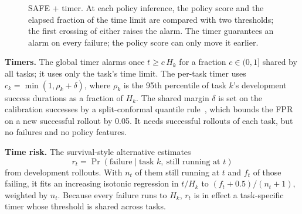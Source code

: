 \documentclass[10pt,a4paper,twocolumn]{article}
\begin{document}
\begin{figure}[t]
\centering
{}
\caption{SAFE + timer. At each policy inference, the policy score and the elapsed fraction
of the time limit are compared with two thresholds; the first crossing of either raises the
alarm. The timer guarantees an alarm on every failure; the policy score can only move it
earlier.}
\label{fig:method}
\end{figure}

\textbf{Timers.} The global timer alarms once $t \ge c\,H_k$ for a fraction $c \in (0, 1]$
shared by all tasks; it uses only the task's time limit. The per-task timer uses
$c_k = \min(1, \rho_k + \delta)$, where $\rho_k$ is the 95th percentile of task $k$'s
development success durations as a fraction of $H_k$. The shared margin $\delta$ is set on the
calibration successes by a split-conformal quantile rule~\cite{angelopoulos2021gentle}, which
bounds the FPR on a new successful rollout by 0.05. It needs successful rollouts of each task,
but no failures and no policy features.

\textbf{Time risk.} The survival-style alternative estimates
\begin{equation}
  r_t = \Pr(\text{failure} \mid \text{task } k,\ \text{still running at } t)
\end{equation}
from development rollouts. With $n_t$ of them still running at $t$ and $f_t$ of those
failing, it fits an increasing isotonic regression in $t/H_k$ to $(f_t+0.5)/(n_t+1)$,
weighted by $n_t$. Because every failure runs to $H_k$, $r_t$ is in effect a task-specific
timer whose threshold is shared across tasks.
\end{document}
